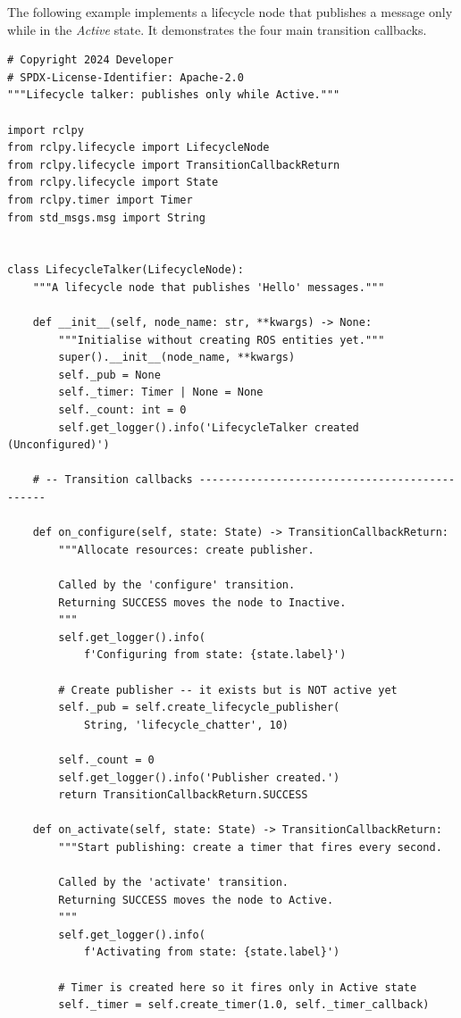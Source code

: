 \documentclass[11pt,a4paper]{csarticle}
\begin{document}
The following example implements a lifecycle node that publishes a
 message only while in the \emph{Active} state.
It demonstrates the four main transition callbacks.

\begin{lstlisting}[style=python,caption={lifecycle\_talker.py -- full example}]
# Copyright 2024 Developer
# SPDX-License-Identifier: Apache-2.0
"""Lifecycle talker: publishes only while Active."""

import rclpy
from rclpy.lifecycle import LifecycleNode
from rclpy.lifecycle import TransitionCallbackReturn
from rclpy.lifecycle import State
from rclpy.timer import Timer
from std_msgs.msg import String


class LifecycleTalker(LifecycleNode):
    """A lifecycle node that publishes 'Hello' messages."""

    def __init__(self, node_name: str, **kwargs) -> None:
        """Initialise without creating ROS entities yet."""
        super().__init__(node_name, **kwargs)
        self._pub = None
        self._timer: Timer | None = None
        self._count: int = 0
        self.get_logger().info('LifecycleTalker created (Unconfigured)')

    # -- Transition callbacks ----------------------------------------------

    def on_configure(self, state: State) -> TransitionCallbackReturn:
        """Allocate resources: create publisher.

        Called by the 'configure' transition.
        Returning SUCCESS moves the node to Inactive.
        """
        self.get_logger().info(
            f'Configuring from state: {state.label}')

        # Create publisher -- it exists but is NOT active yet
        self._pub = self.create_lifecycle_publisher(
            String, 'lifecycle_chatter', 10)

        self._count = 0
        self.get_logger().info('Publisher created.')
        return TransitionCallbackReturn.SUCCESS

    def on_activate(self, state: State) -> TransitionCallbackReturn:
        """Start publishing: create a timer that fires every second.

        Called by the 'activate' transition.
        Returning SUCCESS moves the node to Active.
        """
        self.get_logger().info(
            f'Activating from state: {state.label}')

        # Timer is created here so it fires only in Active state
        self._timer = self.create_timer(1.0, self._timer_callback)


\end{lstlisting}
\end{document}
